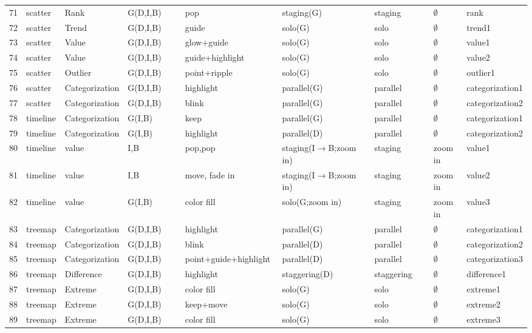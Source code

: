 \begin{landscape}
\begin{longtable}{p{0.035\linewidth}p{0.075\linewidth}p{0.09\linewidth}p{0.13\linewidth}p{0.19\linewidth}p{0.22\linewidth}p{0.13\linewidth}p{0.075\linewidth}p{0.08\linewidth}}
71 & scatter & Rank & G(D,I,B) & pop & staging(G) & staging & $\emptyset$ & rank \\
72 & scatter & Trend & G(D,I,B) & guide & solo(G) & solo & $\emptyset$ & trend1 \\
73 & scatter & Value & G(D,I,B) & glow+guide & solo(G) & solo & $\emptyset$ & value1 \\
74 & scatter & Value & G(D,I,B) & guide+highlight & solo(G) & solo & $\emptyset$ & value2 \\
75 & scatter & Outlier & G(D,I,B) & point+ripple & solo(G) & solo & $\emptyset$ & outlier1 \\
76 & scatter & Categorization & G(D,I,B) & highlight & parallel(G) & parallel & $\emptyset$ & categorization1 \\
77 & scatter & Categorization & G(D,I,B) & blink & parallel(G) & parallel & $\emptyset$ & categorization2 \\
78 & timeline & Categorization & G(I,B) & keep & parallel(G) & parallel & $\emptyset$ & categorization1 \\
79 & timeline & Categorization & G(I,B) & highlight & parallel(D) & parallel & $\emptyset$ & categorization2 \\
80 & timeline & value & I,B & pop,pop & staging(I$\rightarrow$B;zoom in) & staging & zoom in & value1 \\
81 & timeline & value & I,B & move, fade in & staging(I$\rightarrow$B;zoom in) & staging & zoom in & value2 \\
82 & timeline & value & G(I,B) & color fill & solo(G;zoom in) & staging & zoom in & value3 \\
83 & treemap & Categorization & G(D,I,B) & highlight & parallel(G) & parallel & $\emptyset$ & categorization1 \\
84 & treemap & Categorization & G(D,I,B) & blink & parallel(D) & parallel & $\emptyset$ & categorization2 \\
85 & treemap & Categorization & G(D,I,B) & point+guide+highlight & parallel(D) & parallel & $\emptyset$ & categorization3 \\
86 & treemap & Difference & G(D,I,B) & highlight & staggering(D) & staggering & $\emptyset$ & difference1 \\
87 & treemap & Extreme & G(D,I,B) & color fill & solo(G) & solo & $\emptyset$ & extreme1 \\
88 & treemap & Extreme & G(D,I,B) & keep+move & solo(G) & solo & $\emptyset$ & extreme2 \\
89 & treemap & Extreme & G(D,I,B) & color fill & solo(G) & solo & $\emptyset$ & extreme3 \\

\end{longtable}
\end{landscape}
